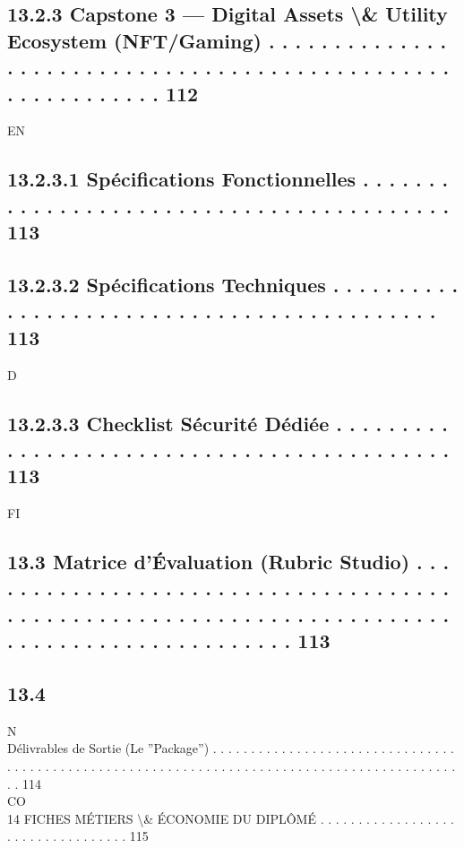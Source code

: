 \subsection{13.2.3    Capstone 3 — Digital Assets \textbackslash{}& Utility Ecosystem (NFT/Gaming) . . . . . . . . . . . . . . . . . . . . . . . . . . . . . . . . . . . . . . . . . . . . . . . . . . . . . . . . . . . . 112}
\vspace{0.5em}
\vspace{0.5em}
\vspace{0.5em}
\vspace{0.5em}
EN\\
\subsection{13.2.3.1 Spécifications Fonctionnelles . . . . . . . . . . . . . . . . . . . . . . . . . . . . . . . . . . . . . . . . . 113}
\subsection{13.2.3.2 Spécifications Techniques . . . . . . . . . . . . . . . . . . . . . . . . . . . . . . . . . . . . . . . . . . . 113}
\vspace{0.5em}
\vspace{0.5em}
\vspace{0.5em}
\vspace{0.5em}
D\\
\subsection{13.2.3.3 Checklist Sécurité Dédiée . . . . . . . . . . . . . . . . . . . . . . . . . . . . . . . . . . . . . . . . . . . 113}
\vspace{0.5em}
\vspace{0.5em}
\vspace{0.5em}
\vspace{0.5em}
FI\\
\subsection{13.3    Matrice d’Évaluation (Rubric Studio) . . . . . . . . . . . . . . . . . . . . . . . . . . . . . . . . . . . . . . . . . . . . . . . . . . . . . . . . . . . . . . . . . . . . . . . . . . . . . . . . . . . . . . . . . . . . . 113}
\subsection{13.4}
N\\
Délivrables de Sortie (Le ”Package”) . . . . . . . . . . . . . . . . . . . . . . . . . . . . . . . . . . . . . . . . . . . . . . . . . . . . . . . . . . . . . . . . . . . . . . . . . . . . . . . . . . . . . . . . . . . . . 114\\
CO\\
14    FICHES MÉTIERS \textbackslash{}& ÉCONOMIE DU DIPLÔMÉ . . . . . . . . . . . . . . . . . . . . . . . . . . . . . . . . . . 115\\
